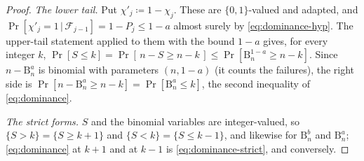 \begin{proof}
\emph{The lower tail.} Put $\chi'_j\coloneqq1-\chi_j$. These are
$\{0,1\}$-valued and adapted, and
$\Pr[\chi'_j=1\,|\,\mathcal{F}_{j-1}]=1-P_j\le1-a$ almost surely by
\eqref{eq:dominance-hyp}. The upper-tail statement applied to them with the
bound $1-a$ gives, for every integer $k$,
$\Pr[S\le k]=\Pr[\,n-S\ge n-k\,]\le\Pr[\mathrm{B}^{1-a}_{n}\ge n-k]$. Since
$n-\mathrm{B}^{a}_{n}$ is binomial with parameters $(n,1-a)$ (it counts the
failures), the right side is $\Pr[n-\mathrm{B}^{a}_{n}\ge n-k]
=\Pr[\mathrm{B}^{a}_{n}\le k]$, the second inequality of
\eqref{eq:dominance}.

\emph{The strict forms.} $S$ and the binomial variables are integer-valued, so
$\{S>k\}=\{S\ge k+1\}$ and $\{S<k\}=\{S\le k-1\}$, and likewise for
$\mathrm{B}^{b}_{n}$ and $\mathrm{B}^{a}_{n}$; \eqref{eq:dominance} at $k+1$
and at $k-1$ is \eqref{eq:dominance-strict}, and conversely.
\end{proof}
